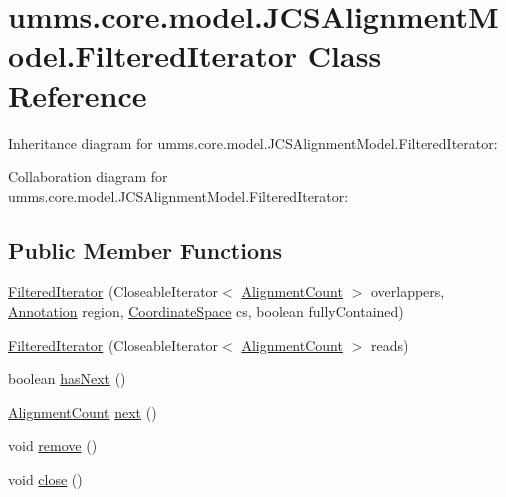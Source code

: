 \hypertarget{classumms_1_1core_1_1model_1_1_j_c_s_alignment_model_1_1_filtered_iterator}{\section{umms.\+core.\+model.\+J\+C\+S\+Alignment\+Model.\+Filtered\+Iterator Class Reference}
\label{classumms_1_1core_1_1model_1_1_j_c_s_alignment_model_1_1_filtered_iterator}
}


Inheritance diagram for umms.\+core.\+model.\+J\+C\+S\+Alignment\+Model.\+Filtered\+Iterator\+:


Collaboration diagram for umms.\+core.\+model.\+J\+C\+S\+Alignment\+Model.\+Filtered\+Iterator\+:
\subsection*{Public Member Functions}
\begin{DoxyCompactItemize}
\item 
\hyperlink{classumms_1_1core_1_1model_1_1_j_c_s_alignment_model_1_1_filtered_iterator_a2a026e7435d7f4241b11b4b48a2c0490}{Filtered\+Iterator} (Closeable\+Iterator$<$ \hyperlink{classumms_1_1core_1_1model_1_1_j_c_s_alignment_model_1_1_alignment_count}{Alignment\+Count} $>$ overlappers, \hyperlink{interfaceumms_1_1core_1_1annotation_1_1_annotation}{Annotation} region, \hyperlink{interfaceumms_1_1core_1_1coordinatesystem_1_1_coordinate_space}{Coordinate\+Space} cs, boolean fully\+Contained)
\item 
\hyperlink{classumms_1_1core_1_1model_1_1_j_c_s_alignment_model_1_1_filtered_iterator_a8c7573f9070f175f4572f88dbbde770b}{Filtered\+Iterator} (Closeable\+Iterator$<$ \hyperlink{classumms_1_1core_1_1model_1_1_j_c_s_alignment_model_1_1_alignment_count}{Alignment\+Count} $>$ reads)
\item 
boolean \hyperlink{classumms_1_1core_1_1model_1_1_j_c_s_alignment_model_1_1_filtered_iterator_ac7b5d4d17b77a32c444767fd37397388}{has\+Next} ()
\item 
\hyperlink{classumms_1_1core_1_1model_1_1_j_c_s_alignment_model_1_1_alignment_count}{Alignment\+Count} \hyperlink{classumms_1_1core_1_1model_1_1_j_c_s_alignment_model_1_1_filtered_iterator_a2b0774eae119ff618bb8fc5b576fdf1e}{next} ()
\item 
void \hyperlink{classumms_1_1core_1_1model_1_1_j_c_s_alignment_model_1_1_filtered_iterator_a80f925324ce2050ce78ccfc7342f2960}{remove} ()
\item 
void \hyperlink{classumms_1_1core_1_1model_1_1_j_c_s_alignment_model_1_1_filtered_iterator_ac131b52f17f049cb7ca31b1fae0918e1}{close} ()
\end{DoxyCompactItemize}


